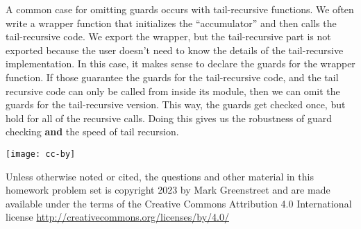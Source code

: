 \documentclass{article}
\begin{document}
A common case for omitting guards occurs with tail-recursive functions.
We often write a wrapper function that initializes the ``accumulator'' and
then calls the tail-recursive code.
We export the wrapper, but the tail-recursive part is not exported because
the user doesn't need to know the details of the tail-recursive implementation.
In this case, it makes sense to declare the guards for the wrapper function.
If those guarantee the guards for the tail-recursive code, and the tail
recursive code can only be called from inside its module, then we can omit
the guards for the tail-recursive version.  This way, the guards get checked
once, but hold for all of the recursive calls.  Doing this gives us the
robustness of guard checking \textbf{and} the speed of tail recursion.\medskip

\vfill
\parbox{0.16\textwidth}{
  \texttt{[image: cc-by]}
}\hfill\parbox{0.80\textwidth}{
  \footnotesize
  Unless otherwise noted or cited, 
  the questions and other material in this homework problem set
  is copyright 2023 by Mark Greenstreet
  and are made available under the terms of the Creative Commons
  Attribution 4.0 International license
  \url{http://creativecommons.org/licenses/by/4.0/}
}
\end{document}
